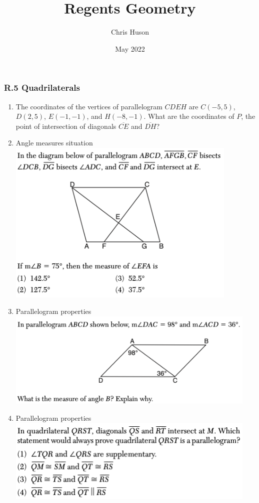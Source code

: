 \documentclass[12pt, oneside]{article}
\title{Regents Geometry}
\author{Chris Huson}
\date{May 2022}
\begin{document}
\subsubsection*{R.5 Quadrilaterals}
\begin{enumerate}
\item The coordinates of the vertices of parallelogram $CDEH$ are $C(-5,5)$, $D(2,5)$, $E(-1,-1)$, and $H(-8,-1)$. What are the coordinates of $P$, the point of intersection of diagonals $\overline{CE}$ and $\overline{DH}$? \vspace{3cm}

\item Angle measures situation\\
\includegraphics[width=11cm]{R-5images/R-5QuadrilateralsA.png}
\vspace{1cm}

\item Parallelogram properties\\
\includegraphics[width=12cm]{R-5images/R-5QuadrilateralsC.png}

\newpage
\item Parallelogram properties\\
\includegraphics[width=12cm]{R-5images/R-5QuadrilateralsB.png}


\end{enumerate}
\end{document}
